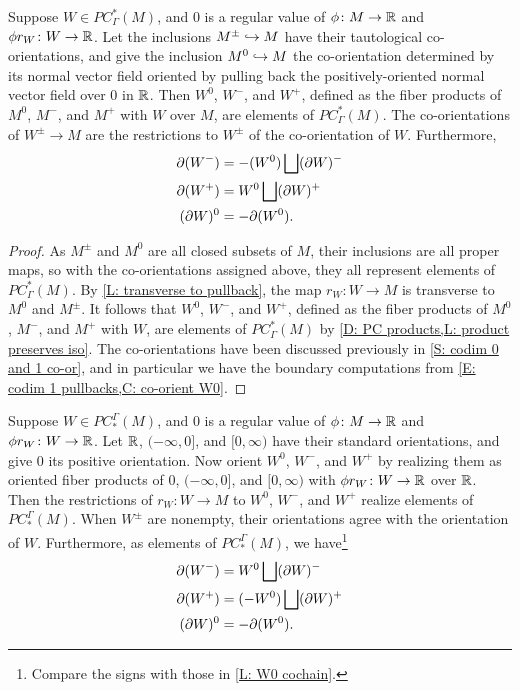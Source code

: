 \begin{lemma}\label{L: W0 cochain}
	Suppose $W \in PC^*_\Gamma(M)$, and $0$ is a regular value of $\phi \colon M \to \mathbb{R}$ and $\phi r_W \colon W \to \mathbb{R}$.
	Let the inclusions $M^\pm \hookrightarrow M$ have their tautological co-orientations, and give the inclusion $M^0 \hookrightarrow M$ the co-orientation determined by its normal vector field oriented by pulling back the positively-oriented normal vector field over $0$ in $\mathbb{R}$.
	Then $W^0$, $W^-$, and $W^+$, defined as the fiber products of $M^0$, $M^-$, and $M^+$ with $W$ over $M$, are elements of $PC^*_\Gamma(M)$.
	The co-orientations of $W^\pm \to M$ are the restrictions to $W^\pm$ of the co-orientation of $W$.
	Furthermore,
	\begin{align*}
		\partial(W^-) &= -(W^0) \bigsqcup (\partial W)^- \\
		\partial (W^+) &= W^0 \bigsqcup (\partial W)^+\\
		(\partial W)^0 &= -\partial (W^0).
	\end{align*}
\end{lemma}
\begin{proof}
	As $M^\pm$ and $M^0$ are all closed subsets of $M$, their inclusions are all proper maps, so with the co-orientations assigned above, they all represent elements of $PC^*_\Gamma(M)$.
	By \cref{L: transverse to pullback}, the map $r_W \colon W \to M$ is transverse to $M^0$ and $M^\pm$.
	It follows that $W^0$, $W^-$, and $W^+$, defined as the fiber products of $M^0$, $M^-$, and $M^+$ with $W$, are elements of $PC^*_\Gamma(M)$ by \cref{D: PC products,L: product preserves iso}.
	The co-orientations have been discussed previously in \cref{S: codim 0 and 1 co-or}, and in particular we have the boundary computations from \cref{E: codim 1 pullbacks,C: co-orient W0}.
\end{proof}


\begin{lemma}\label{L: W0 chain}
	Suppose $W \in PC_*^\Gamma(M)$, and $0$ is a regular value of $\phi \colon M \to \mathbb{R}$ and $\phi r_W \colon W \to \mathbb{R}$.
	Let $\mathbb{R}$, $(-\infty, 0]$, and $[0,\infty)$ have their standard orientations, and give $0$ its positive orientation.
	Now orient $W^0$, $W^-$, and $W^+$ by realizing them as oriented fiber products of $0$, $(-\infty, 0]$, and $[0,\infty)$ with $\phi r_W \colon W \to \mathbb{R}$ over $\mathbb{R}$.
	Then the restrictions of $r_W \colon W \to M$ to $W^0$, $W^-$, and $W^+$ realize elements of $PC_*^\Gamma(M)$.
	When $W^\pm$ are nonempty, their orientations agree with the orientation of $W$.
	Furthermore, as elements of $PC_*^\Gamma(M)$, we have\footnote{Compare the signs with those in \cref{L: W0 cochain}.}
	\begin{align*}
		\partial(W^-) &= W^0 \bigsqcup (\partial W)^- \\
		\partial(W^+) &= (-W^0) \bigsqcup (\partial W)^+\\
		(\partial W)^0 &= -\partial (W^0).
	\end{align*}
\end{lemma}

